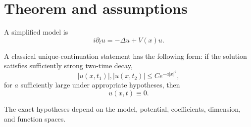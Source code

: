 \section{Theorem and assumptions}

A simplified model is
\[
i\partial_t u = -\Delta u + V(x)u.
\]

A classical unique-continuation statement has the following form: if the solution satisfies sufficiently strong two-time decay,
\[
|u(x,t_1)|, |u(x,t_2)| \le C e^{-a|x|^2},
\]
for \(a\) sufficiently large under appropriate hypotheses, then
\[
u(x,t) \equiv 0.
\]

The exact hypotheses depend on the model, potential, coefficients, dimension, and function spaces.

